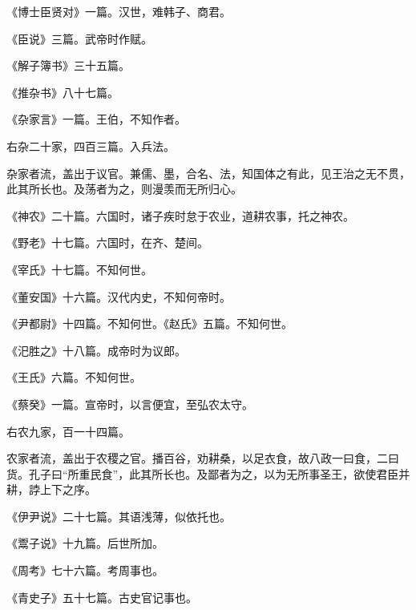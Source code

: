 \documentclass[12pt,UTF8]{ctexbook}
\begin{document}
《博士臣贤对》一篇。汉世，难韩子、商君。



《臣说》三篇。武帝时作赋。



《解子簿书》三十五篇。



《推杂书》八十七篇。



《杂家言》一篇。王伯，不知作者。



右杂二十家，四百三篇。入兵法。



杂家者流，盖出于议官。兼儒、墨，合名、法，知国体之有此，见王治之无不贯，此其所长也。及荡者为之，则漫羡而无所归心。



《神农》二十篇。六国时，诸子疾时怠于农业，道耕农事，托之神农。



《野老》十七篇。六国时，在齐、楚间。



《宰氏》十七篇。不知何世。



《董安国》十六篇。汉代内史，不知何帝时。



《尹都尉》十四篇。不知何世。《赵氏》五篇。不知何世。



《汜胜之》十八篇。成帝时为议郎。



《王氏》六篇。不知何世。



《蔡癸》一篇。宣帝时，以言便宜，至弘农太守。



右农九家，百一十四篇。



农家者流，盖出于农稷之官。播百谷，劝耕桑，以足衣食，故八政一曰食，二曰货。孔子曰“所重民食”，此其所长也。及鄙者为之，以为无所事圣王，欲使君臣并耕，誖上下之序。



《伊尹说》二十七篇。其语浅薄，似依托也。



《鬻子说》十九篇。后世所加。



《周考》七十六篇。考周事也。



《青史子》五十七篇。古史官记事也。
\end{document}

